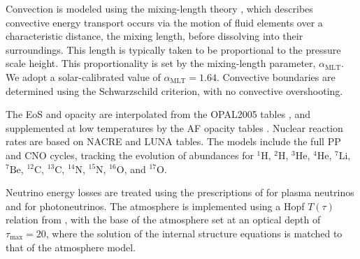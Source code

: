 \documentclass[12pt,a4paper]{article}
\newcommand{\mr}{\mathrm}
\begin{document}
Convection is modeled using the mixing-length theory \parencite[MLT;][]{CoxGiuli1968a}, which describes convective energy transport occurs via the motion of fluid elements over a characteristic distance, the mixing length, before dissolving into their surroundings. This length is typically taken to be proportional to the pressure scale height. This proportionality is set by the mixing-length parameter, $\alpha_\mr{MLT}$. We adopt a solar-calibrated value of $\alpha_\mr{MLT} = 1.64$. Convective boundaries are determined using the Schwarzschild criterion, with no convective overshooting.

The EoS and opacity are interpolated from the OPAL2005 tables \parencite{RogersIglesias1992,IglesiasRogers1996,RogersNayfonov2002}, and supplemented at low temperatures by the AF opacity tables \parencite{FergusonEtAl2005}. Nuclear reaction rates are based on NACRE \parencite{AikawaEtAl2006} and LUNA \parencite{BrogginiEtAl2018} tables. The models include the full PP and CNO cycles, tracking the evolution of abundances for $^{1}\mr{H}$, $^{2}\mr{H}$, $^{3}\mr{He}$, $^{4}\mr{He}$, $^{7}\mr{Li}$, $^{7}\mr{Be}$, $^{12}\mr{C}$, $^{13}\mr{C}$, $^{14}\mr{N}$, $^{15}\mr{N}$, $^{16}\mr{O}$, and $^{17}\mr{O}$.

Neutrino energy losses are treated using the prescriptions of \textcite{HaftEtAl1994} for plasma neutrinos and \textcite{Weigert1966} for photoneutrinos. The atmosphere is implemented using a Hopf $T(\tau)$ relation from \textcite{HubenyMihalas2015}, with the base of the atmosphere set at an optical depth of $\tau_{\max} = 20$, where the solution of the internal structure equations is matched to that of the atmosphere model.
\end{document}
